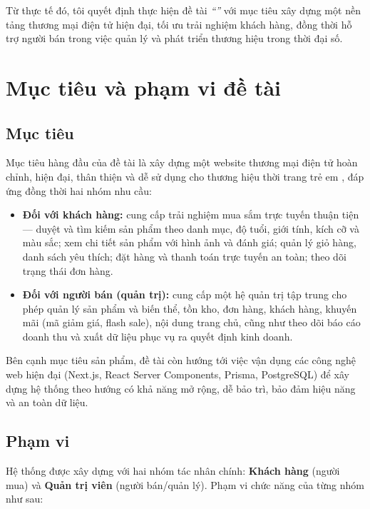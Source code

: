 Từ thực tế đó, tôi quyết định thực hiện đề tài \textit{``\thesisTitle''} với mục tiêu xây dựng một
nền tảng thương mại điện tử hiện đại, tối ưu trải nghiệm khách hàng, đồng thời hỗ trợ người bán
trong việc quản lý và phát triển thương hiệu trong thời đại số.

\section{Mục tiêu và phạm vi đề tài}

\subsection{Mục tiêu}

Mục tiêu hàng đầu của đề tài là xây dựng một website thương mại điện tử hoàn chỉnh, hiện đại,
thân thiện và dễ sử dụng cho thương hiệu thời trang trẻ em \brandName{}, đáp ứng đồng thời hai
nhóm nhu cầu:

\begin{itemize}
  \item \textbf{Đối với khách hàng:} cung cấp trải nghiệm mua sắm trực tuyến thuận tiện ---
  duyệt và tìm kiếm sản phẩm theo danh mục, độ tuổi, giới tính, kích cỡ và màu sắc; xem chi
  tiết sản phẩm với hình ảnh và đánh giá; quản lý giỏ hàng, danh sách yêu thích; đặt hàng và
  thanh toán trực tuyến an toàn; theo dõi trạng thái đơn hàng.

  \item \textbf{Đối với người bán (quản trị):} cung cấp một hệ quản trị tập trung cho phép quản
  lý sản phẩm và biến thể, tồn kho, đơn hàng, khách hàng, khuyến mãi (mã giảm giá, flash sale),
  nội dung trang chủ, cũng như theo dõi báo cáo doanh thu và xuất dữ liệu phục vụ ra quyết định
  kinh doanh.
\end{itemize}

Bên cạnh mục tiêu sản phẩm, đề tài còn hướng tới việc vận dụng các công nghệ web hiện đại
(Next.js, React Server Components, Prisma, PostgreSQL) để xây dựng hệ thống theo hướng có
khả năng mở rộng, dễ bảo trì, bảo đảm hiệu năng và an toàn dữ liệu.

\subsection{Phạm vi}

Hệ thống \brandName{} được xây dựng với hai nhóm tác nhân chính: \textbf{Khách hàng} (người
mua) và \textbf{Quản trị viên} (người bán/quản lý). Phạm vi chức năng của từng nhóm như sau:

